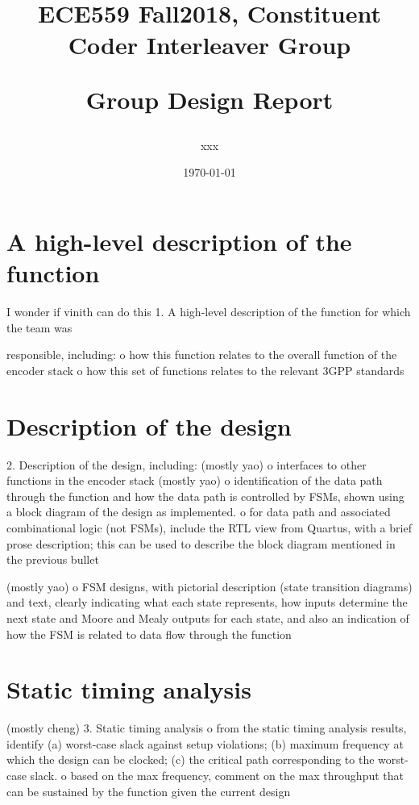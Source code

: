 \documentclass[letterpaper]{article} %
\begin{document}
\title{ECE559 Fall2018, Constituent Coder Interleaver Group\\
\begin{large}Group Design Report\end{large}}
\author{xxx}
\date{\today}%
\maketitle
\vspace{12.0cm}


\newpage 
\section{A high-level description of the function}
I wonder if vinith can do this
1.  A high-level description of the function for which the team was
    
        responsible, including:
         o  how this function relates to the overall function of the
            encoder stack
         o  how this set of functions relates to the relevant 3GPP standards
\section{Description of the design}
    2.  Description of the design, including:
        (mostly yao)
         o  interfaces to other functions in the encoder stack
        (mostly yao)
         o  identification of the data path through the function and
		    how the data path is controlled by FSMs, shown using a
			block diagram of the design as implemented. 
         o  for data path and associated combinational logic (not FSMs), include
            the RTL view from Quartus, with a brief prose description;  this can
            be used to describe the block diagram mentioned in the
			previous bullet

		(mostly yao)
         o  FSM designs, with pictorial description (state transition diagrams)
            and text, clearly indicating what each state
            represents, how inputs determine the next state and Moore and Mealy
            outputs for each state, and also an indication of how the FSM is
            related to data flow through the function
\section{Static timing analysis}
(mostly cheng)
    3.  Static timing analysis
		 o  from the static timing analysis results, identify (a) worst-case slack
		 	against setup violations;  (b) maximum frequency at which the design
			can be clocked;  (c) the critical path corresponding to the worst-case
			slack.
		 o	based on the max frequency, comment on the max throughput that can
		 	be sustained by the function given the current design
\end{document}
